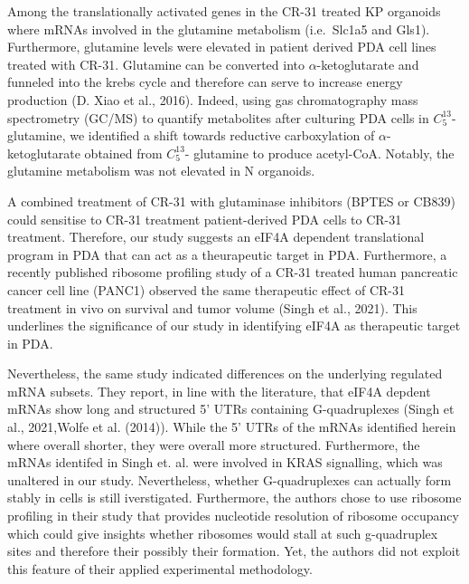\documentclass[12pt,openany]{book}
\begin{document}
Among the translationally activated genes in the CR-31 treated KP
organoids where mRNAs involved in the glutamine metabolism (i.e.~Slc1a5
and Gls1). Furthermore, glutamine levels were elevated in patient
derived PDA cell lines treated with CR-31. Glutamine can be converted
into \(\alpha\)-ketoglutarate and funneled into the krebs cycle and
therefore can serve to increase energy production (D. Xiao et al.,
2016). Indeed, using gas chromatography mass spectrometry (GC/MS) to
quantify metabolites after culturing PDA cells in \(C_5^{13}\)-
glutamine, we identified a shift towards reductive carboxylation of
\(\alpha\)-ketoglutarate obtained from \(C_5^{13}\)- glutamine to
produce acetyl-CoA. Notably, the glutamine metabolism was not elevated
in N organoids.

A combined treatment of CR-31 with glutaminase inhibitors (BPTES or
CB839) could sensitise to CR-31 treatment patient-derived PDA cells to
CR-31 treatment. Therefore, our study suggests an eIF4A dependent
translational program in PDA that can act as a theurapeutic target in
PDA. Furthermore, a recently published ribosome profiling study of a
CR-31 treated human pancreatic cancer cell line (PANC1) observed the
same therapeutic effect of CR-31 treatment in vivo on survival and tumor
volume (Singh et al., 2021). This underlines the significance of our
study in identifying eIF4A as therapeutic target in PDA.

Nevertheless, the same study indicated differences on the underlying
regulated mRNA subsets. They report, in line with the literature, that
eIF4A depdent mRNAs show long and structured 5' UTRs containing
G-quadruplexes (Singh et al., 2021,Wolfe et al. (2014)). While the 5'
UTRs of the mRNAs identified herein where overall shorter, they were
overall more structured. Furthermore, the mRNAs identifed in Singh et.
al. were involved in KRAS signalling, which was unaltered in our study.
Nevertheless, whether G-quadruplexes can actually form stably in cells
is still iverstigated. Furthermore, the authors chose to use ribosome
profiling in their study that provides nucleotide resolution of ribosome
occupancy which could give insights whether ribosomes would stall at
such g-quadruplex sites and therefore their possibly their formation.
Yet, the authors did not exploit this feature of their applied
experimental methodology.
\end{document}
